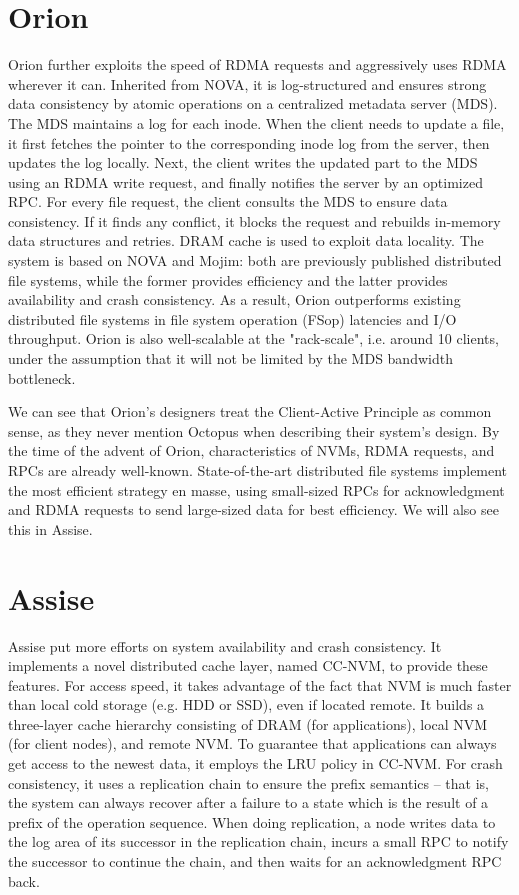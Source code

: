 \begin{survey}
\section{Orion}
Orion further exploits the speed of RDMA requests and aggressively uses RDMA wherever it can. Inherited from NOVA\cite{snova2016}, it is log-structured and ensures strong data consistency by atomic operations on a centralized metadata server (MDS). The MDS maintains a log for each inode. When the client needs to update a file, it first fetches the pointer to the corresponding inode log from the server, then updates the log locally. Next, the client writes the updated part to the MDS using an RDMA write request, and finally notifies the server by an optimized RPC. For every file request, the client consults the MDS to ensure data consistency. If it finds any conflict, it blocks the request and rebuilds in-memory data structures and retries. DRAM cache is used to exploit data locality. The system is based on NOVA and Mojim: both are previously published distributed file systems, while the former provides efficiency and the latter provides availability and crash consistency. As a result, Orion outperforms existing distributed file systems in file system operation (FSop) latencies and I/O throughput. Orion is also well-scalable at the "rack-scale", i.e. around 10 clients, under the assumption that it will not be limited by the MDS bandwidth bottleneck.

We can see that Orion’s designers treat the Client-Active Principle as common sense, as they never mention Octopus when describing their system’s design. By the time of the advent of Orion, characteristics of NVMs, RDMA requests, and RPCs are already well-known. State-of-the-art distributed file systems implement the most efficient strategy en masse, using small-sized RPCs for acknowledgment and RDMA requests to send large-sized data for best efficiency. We will also see this in Assise.

\section{Assise}
Assise put more efforts on system availability and crash consistency. It implements a novel distributed cache layer, named CC-NVM, to provide these features. For access speed, it takes advantage of the fact that NVM is much faster than local cold storage (e.g. HDD or SSD), even if located remote. It builds a three-layer cache hierarchy consisting of DRAM (for applications), local NVM (for client nodes), and remote NVM. To guarantee that applications can always get access to the newest data, it employs the LRU policy in CC-NVM. For crash consistency, it uses a replication chain to ensure the prefix semantics – that is, the system can always recover after a failure to a state which is the result of a prefix of the operation sequence. When doing replication, a node writes data to the log area of its successor in the replication chain, incurs a small RPC to notify the successor to continue the chain, and then waits for an acknowledgment RPC back.


\end{survey}
